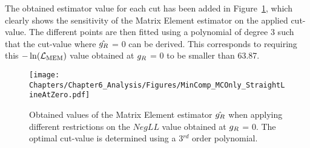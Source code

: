 The obtained estimator value for each cut has been added in Figure~\ref{fig::CutValueFit}, which clearly shows the sensitivity of the Matrix Element estimator on the applied cut-value.
The different points are then fitted using a polynomial of degree $3$ such that the cut-value where $\hat{g_{R}}$ = 0 can be derived. This corresponds to requiring this $-\ln(\mathcal{L}_{\textrm{MEM}})$ value obtained at $g_{R}$ = 0 to be smaller than 63.87.
\\
\begin{figure}[h!t]
 \centering
 \texttt{[image: Chapters/Chapter6\_Analysis/Figures/MinComp\_MCOnly\_StraightLineAtZero.pdf]}  %
 \caption{Obtained values of the Matrix Element estimator $\hat{g_{R}}$ when applying different restrictions on the $NegLL$ value obtained at $g_{R}$ = 0. The optimal cut-value is determined using a 3$^{rd}$ order polynomial.} \label{fig::CutValueFit}
\end{figure}

